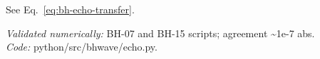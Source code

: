 \begin{theorem}
\noindent See Eq.~\eqref{eq:bh-echo-transfer}.
\end{theorem}
\noindent\textit{Validated numerically:} BH-07 and BH-15 scripts; agreement \textasciitilde{}1e-7 abs.\\
\noindent\textit{Code:} python/src/bhwave/echo.py.
